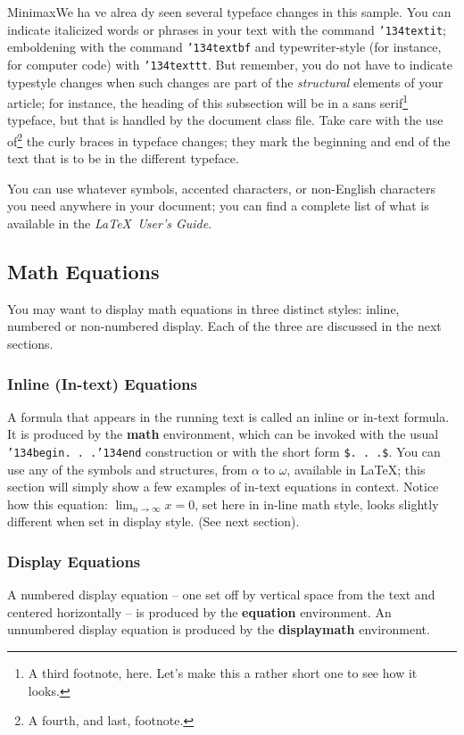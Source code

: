 \documentclass{acm_proc_article-sp}
\begin{document}
\qquad MinimaxWe ha \qquad ve alrea \qquad dy seen several typeface changes in this sample.  You
can indicate italicized words or phrases in your text with
the command \texttt{{\char'134}textit}; emboldening with the
command \texttt{{\char'134}textbf}
and typewriter-style (for instance, for computer code) with
\texttt{{\char'134}texttt}.  But remember, you do not
have to indicate typestyle changes when such changes are
part of the \textit{structural} elements of your
article; for instance, the heading of this subsection will
be in a sans serif\footnote{A third footnote, here.
Let's make this a rather short one to
see how it looks.} typeface, but that is handled by the
document class file. Take care with the use
of\footnote{A fourth, and last, footnote.}
the curly braces in typeface changes; they mark
the beginning and end of
the text that is to be in the different typeface.

You can use whatever symbols, accented characters, or
non-English characters you need anywhere in your document;
you can find a complete list of what is
available in the \textit{\LaTeX\
User's Guide}\cite{Lamport:LaTeX}.

\subsection{Math Equations}
You may want to display math equations in three distinct styles:
inline, numbered or non-numbered display.  Each of
the three are discussed in the next sections.

\subsubsection{Inline (In-text) Equations}
A formula that appears in the running text is called an
inline or in-text formula.  It is produced by the
\textbf{math} environment, which can be
invoked with the usual \texttt{{\char'134}begin. . .{\char'134}end}
construction or with the short form \texttt{\$. . .\$}. You
can use any of the symbols and structures,
from $\alpha$ to $\omega$, available in
\LaTeX\cite{Lamport:LaTeX}; this section will simply show a
few examples of in-text equations in context. Notice how
this equation: \begin{math}\lim_{n\rightarrow \infty}x=0\end{math},
set here in in-line math style, looks slightly different when
set in display style.  (See next section).

\subsubsection{Display Equations}
A numbered display equation -- one set off by vertical space
from the text and centered horizontally -- is produced
by the \textbf{equation} environment. An unnumbered display
equation is produced by the \textbf{displaymath} environment.
\end{document}
